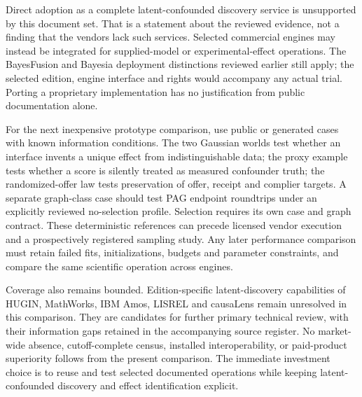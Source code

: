 Direct adoption as a complete latent-confounded discovery service is
unsupported by this document set. That is a statement about the reviewed
evidence, not a finding that the vendors lack such services. Selected
commercial engines may instead be integrated for supplied-model or
experimental-effect operations. The BayesFusion and Bayesia deployment
distinctions reviewed earlier still apply; the selected edition, engine
interface and rights would accompany any actual trial. Porting a
proprietary implementation has no justification from public
documentation alone. \citep{exec13_smile_license,exec13_bayesia_api}

For the next inexpensive prototype comparison, use public or generated
cases with known information conditions. The two Gaussian worlds test
whether an interface invents a unique effect from indistinguishable
data; the proxy example tests whether a score is silently treated as
measured confounder truth; the randomized-offer law tests preservation
of offer, receipt and complier targets. A separate graph-class case
should test PAG endpoint roundtrips under an explicitly reviewed
no-selection profile. Selection requires its own case and graph
contract. These deterministic references can precede licensed vendor
execution and a prospectively registered sampling study. Any later
performance comparison must retain failed fits, initializations, budgets
and parameter constraints, and compare the same scientific operation
across engines.

Coverage also remains bounded. Edition-specific latent-discovery
capabilities of HUGIN, MathWorks, IBM Amos, LISREL and causaLens remain
unresolved in this comparison. They are candidates for further primary
technical review, with their information gaps retained in the
accompanying source register. No market-wide absence, cutoff-complete
census, installed interoperability, or paid-product superiority follows
from the present comparison. The immediate investment choice is to reuse
and test selected documented operations while keeping latent-confounded
discovery and effect identification explicit.
\label{exec13:latent-commercial-end}
